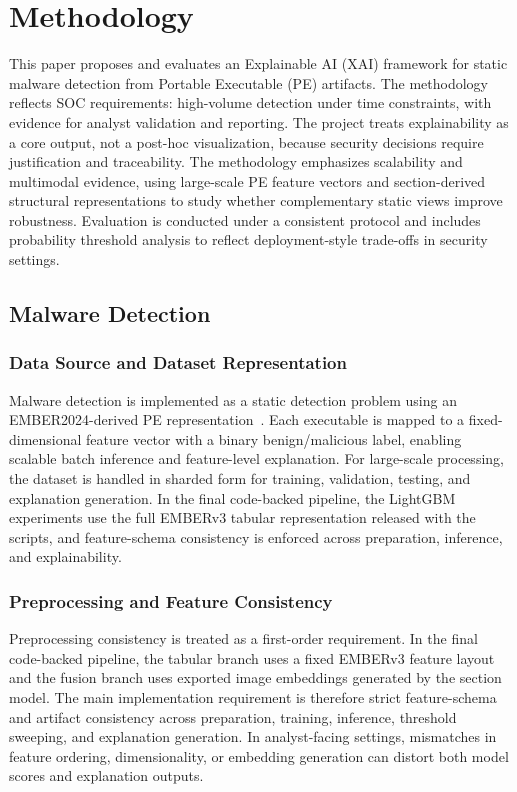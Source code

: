 \documentclass[conference]{IEEEtran}
\begin{document}
\section{Methodology}
\label{section:methodology}

This paper proposes and evaluates an Explainable AI (XAI) framework for static malware detection from Portable Executable (PE) artifacts.
The methodology reflects SOC requirements: high-volume detection under time constraints, with evidence for analyst validation and reporting.
The project treats explainability as a core output, not a post-hoc visualization, because security decisions require justification and traceability.
The methodology emphasizes scalability and multimodal evidence, using large-scale PE feature vectors and section-derived structural representations to study whether complementary static views improve robustness.
Evaluation is conducted under a consistent protocol and includes probability threshold analysis to reflect deployment-style trade-offs in security settings.

\subsection{Malware Detection}
\subsubsection{Data Source and Dataset Representation}

Malware detection is implemented as a static detection problem using an EMBER2024-derived PE representation~\cite{JMGPR2024,HP20182018}.
Each executable is mapped to a fixed-dimensional feature vector with a binary benign/malicious label, enabling scalable batch inference and feature-level explanation.
For large-scale processing, the dataset is handled in sharded form for training, validation, testing, and explanation generation.
In the final code-backed pipeline, the LightGBM experiments use the full EMBERv3 tabular representation released with the scripts, and feature-schema consistency is enforced across preparation, inference, and explainability.

\subsubsection{Preprocessing and Feature Consistency}

Preprocessing consistency is treated as a first-order requirement.
In the final code-backed pipeline, the tabular branch uses a fixed EMBERv3 feature layout and the fusion branch uses exported image embeddings generated by the section model.
The main implementation requirement is therefore strict feature-schema and artifact consistency across preparation, training, inference, threshold sweeping, and explanation generation.
In analyst-facing settings, mismatches in feature ordering, dimensionality, or embedding generation can distort both model scores and explanation outputs.
\end{document}
